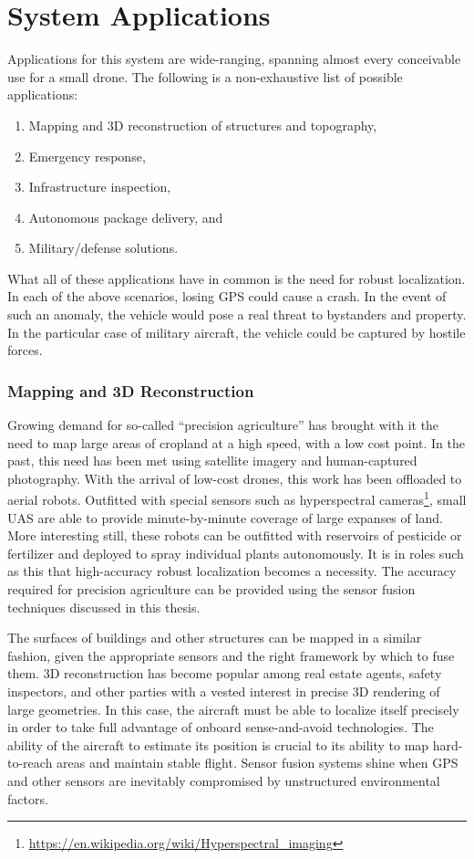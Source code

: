 \section{System Applications}

Applications for this system are wide-ranging, spanning almost every conceivable use for a small drone. The following is a non-exhaustive list of possible applications:
\begin{enumerate}
    \item Mapping and 3D reconstruction of structures and topography,
    \item Emergency response,
    \item Infrastructure inspection,
    \item Autonomous package delivery, and
    \item Military/defense solutions.
\end{enumerate}
What all of these applications have in common is the need for robust localization. In each of the above scenarios, losing GPS could cause a crash. In the event of such an anomaly, the vehicle would pose a real threat to bystanders and property. In the particular case of military aircraft, the vehicle could be captured by hostile forces.

\subsubsection{Mapping and 3D Reconstruction}

Growing demand for so-called ``precision agriculture'' has brought with it the need to map large areas of cropland at a high speed, with a low cost point. In the past, this need has been met using satellite imagery and human-captured photography. With the arrival of low-cost drones, this work has been offloaded to aerial robots. Outfitted with special sensors such as hyperspectral cameras\footnote{\url{https://en.wikipedia.org/wiki/Hyperspectral_imaging}}, small UAS are able to provide minute-by-minute coverage of large expanses of land. More interesting still, these robots can be outfitted with reservoirs of pesticide or fertilizer and deployed to spray individual plants autonomously. It is in roles such as this that high-accuracy robust localization becomes a necessity. The accuracy required for precision agriculture can be provided using the sensor fusion techniques discussed in this thesis.

The surfaces of buildings and other structures can be mapped in a similar fashion, given the appropriate sensors and the right framework by which to fuse them. 3D reconstruction has become popular among real estate agents, safety inspectors, and other parties with a vested interest in precise 3D rendering of large geometries. In this case, the aircraft must be able to localize itself precisely in order to take full advantage of onboard sense-and-avoid technologies. The ability of the aircraft to estimate its position is crucial to its ability to map hard-to-reach areas and maintain stable flight. Sensor fusion systems shine when GPS and other sensors are inevitably compromised by unstructured environmental factors.

